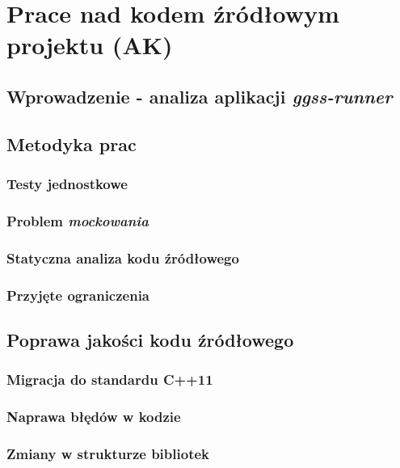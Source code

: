 \chapter{Prace nad kodem źródłowym projektu (AK)}
\label{cha:code}

\section{Wprowadzenie - analiza aplikacji \emph{ggss-runner}}

\section{Metodyka prac}

    \subsection{Testy jednostkowe}

    \subsection{Problem \emph{mockowania}}

    \subsection{Statyczna analiza kodu źródłowego}

    \subsection{Przyjęte ograniczenia}

\section{Poprawa jakości kodu źródłowego}

    \subsection{Migracja do standardu C++11}

    \subsection{Naprawa błędów w kodzie}

    \subsection{Zmiany w strukturze bibliotek}


